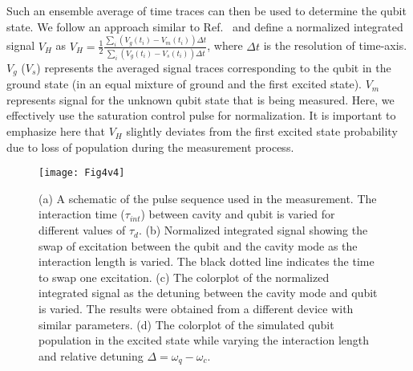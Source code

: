 \documentclass[a4paper, amsfonts, amssymb, amsmath, reprint,showkeys,nofootinbib,superscriptaddress]{revtex4-2}
\begin{document}
Such an ensemble average of time traces can 
then be used to determine the qubit state. We follow an
approach similar to Ref.~\cite{bianchetti_dynamics_2009}
and define a normalized integrated signal 
$V_H$ as $V_H = \frac{1}{2} \frac{\sum_i \left(V_g (t_i) - V_m (t_i)\right)\Delta t }{\sum_i \left(V_g (t_i) - V_s (t_i)\right)\Delta t}$, where $\Delta t$ is the 
resolution of time-axis. $V_g$ ($V_s$) represents the averaged signal 
traces corresponding to the qubit in the ground state (in an 
equal mixture of ground and the first excited state). 
$V_m$ represents signal for the unknown qubit state that is 
being measured. Here, we effectively use the saturation control pulse for 
normalization. It is important to emphasize here that 
$V_H$ slightly deviates from the first excited state probability 
due to loss of population during the measurement process. 



\begin{figure*}
	\texttt{[image: Fig4v4]}
	\caption{(a) A schematic of the pulse sequence used in the measurement. 
		The interaction  time ($\tau_{int}$) between cavity and qubit is varied for 
		different values of $\tau_{d}$. (b) Normalized integrated signal showing the swap
		of excitation between the qubit and the cavity mode as the interaction length is 
		varied. The black dotted line indicates the time to swap one excitation.
		(c) The colorplot of the normalized integrated signal as the detuning between the 
		cavity mode and qubit is varied. The results were
		obtained from a different device with similar parameters. 
		(d) The colorplot of the simulated qubit population in the excited 
		state while varying the interaction length and relative 
		detuning $\Delta = \omega_q - \omega_c$.}
	\label{fig4}
\end{figure*}
\end{document}
